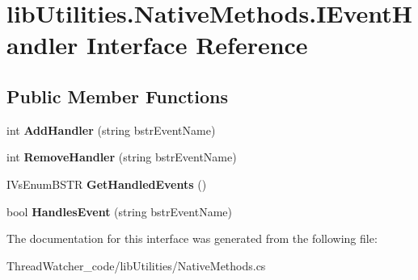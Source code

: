\hypertarget{interfacelib_utilities_1_1_native_methods_1_1_i_event_handler}{\section{lib\+Utilities.\+Native\+Methods.\+I\+Event\+Handler Interface Reference}
\label{interfacelib_utilities_1_1_native_methods_1_1_i_event_handler}
}
\subsection*{Public Member Functions}
\begin{DoxyCompactItemize}
\item 
\hypertarget{interfacelib_utilities_1_1_native_methods_1_1_i_event_handler_ad8e77f2893392dff0bdbe984548c9955}{int {\bfseries Add\+Handler} (string bstr\+Event\+Name)}\label{interfacelib_utilities_1_1_native_methods_1_1_i_event_handler_ad8e77f2893392dff0bdbe984548c9955}

\item 
\hypertarget{interfacelib_utilities_1_1_native_methods_1_1_i_event_handler_aa4eae96e0bdf61ddaf32d15c90a89c51}{int {\bfseries Remove\+Handler} (string bstr\+Event\+Name)}\label{interfacelib_utilities_1_1_native_methods_1_1_i_event_handler_aa4eae96e0bdf61ddaf32d15c90a89c51}

\item 
\hypertarget{interfacelib_utilities_1_1_native_methods_1_1_i_event_handler_a1bb634760223afdae786b6e0fd1b9fa8}{I\+Vs\+Enum\+B\+S\+T\+R {\bfseries Get\+Handled\+Events} ()}\label{interfacelib_utilities_1_1_native_methods_1_1_i_event_handler_a1bb634760223afdae786b6e0fd1b9fa8}

\item 
\hypertarget{interfacelib_utilities_1_1_native_methods_1_1_i_event_handler_a0ed611197d5fbc30a50de5b26becb5ee}{bool {\bfseries Handles\+Event} (string bstr\+Event\+Name)}\label{interfacelib_utilities_1_1_native_methods_1_1_i_event_handler_a0ed611197d5fbc30a50de5b26becb5ee}

\end{DoxyCompactItemize}


The documentation for this interface was generated from the following file\+:\begin{DoxyCompactItemize}
\item 
Thread\+Watcher\+\_\+code/lib\+Utilities/Native\+Methods.\+cs\end{DoxyCompactItemize}
